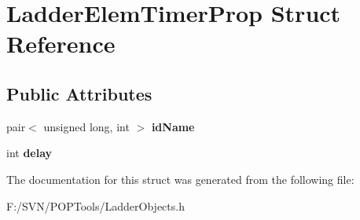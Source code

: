 \hypertarget{struct_ladder_elem_timer_prop}{\section{Ladder\-Elem\-Timer\-Prop Struct Reference}
\label{struct_ladder_elem_timer_prop}
}
\subsection*{Public Attributes}
\begin{DoxyCompactItemize}
\item 
\hypertarget{struct_ladder_elem_timer_prop_abc9a55ca3001da6f68cc459cab4e416f}{pair$<$ unsigned long, int $>$ {\bfseries id\-Name}}\label{struct_ladder_elem_timer_prop_abc9a55ca3001da6f68cc459cab4e416f}

\item 
\hypertarget{struct_ladder_elem_timer_prop_a9d164e547ca02f6c011970d450b5d0a9}{int {\bfseries delay}}\label{struct_ladder_elem_timer_prop_a9d164e547ca02f6c011970d450b5d0a9}

\end{DoxyCompactItemize}


The documentation for this struct was generated from the following file\-:\begin{DoxyCompactItemize}
\item 
F\-:/\-S\-V\-N/\-P\-O\-P\-Tools/Ladder\-Objects.\-h\end{DoxyCompactItemize}
